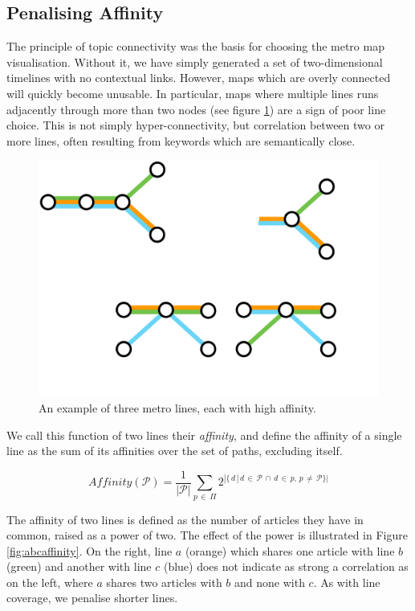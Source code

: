 \subsection{Penalising Affinity} \label{sec:affinity}

The principle of topic connectivity was the basis for choosing the metro map visualisation. Without it, we have simply generated a set of two-dimensional timelines with no contextual links. However, maps which are overly connected will quickly become unusable. In particular, maps where multiple lines runs adjacently through more than two nodes (see figure \ref{fig:lowaffinity}) are a sign of poor line choice. This is not simply hyper-connectivity, but correlation between two or more lines, often resulting from keywords which are semantically close.

\begin{figure}[htbp!]
	\centering
	\includegraphics[width=.4\textwidth]{img/implementation/lowaffinity.pdf}
	\caption{An example of three metro lines, each with high affinity.}
	\label{fig:lowaffinity}
\end{figure}

We call this function of two lines their \textit{affinity}, and define the affinity of a single line as the sum of its affinities over the set of paths, excluding itself.

\begin{equation}
	Affinity(\mathcal{P}) = \frac{1}{|\mathcal{P}|} \sum_{p\,\in{\,\Pi}} 2^{|\{\,d\,|\,d\,\in\,{\mathcal{P}}\,\cap\,d\,\in\,{p},\,p\,\neq\,\mathcal{P}\}|}
\end{equation}

The affinity of two lines is defined as the number of articles they have in common, raised as a power of two. The effect of the power is illustrated in Figure \ref{fig:abcaffinity}. On the right, line $a$ (orange) which shares one article with line $b$ (green) and another with line $c$ (blue) does not indicate as strong a correlation as on the left, where $a$ shares two articles with $b$ and none with $c$. As with line coverage, we penalise shorter lines.

